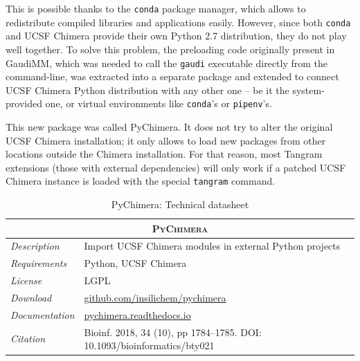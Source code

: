 This is possible thanks to the \texttt{conda} package manager,\cite{conda} which allows to redistribute compiled libraries and applications easily. However, since both \texttt{conda} and UCSF Chimera provide their own Python 2.7 distribution, they do not play well together. To solve this problem, the preloading code originally present in GaudiMM, which was needed to call the \texttt{gaudi} executable directly from the command-line, was extracted into a separate package and extended to connect UCSF Chimera Python distribution with any other one – be it the system-provided one, or virtual environments like \texttt{conda}'s or \texttt{pipenv}'s.

This new package was called PyChimera.\cite{pychimera} It does not try to alter the original UCSF Chimera installation; it only allows to load new packages from other locations outside the Chimera installation. For that reason, most Tangram extensions (those with external dependencies) will only work if a patched UCSF Chimera instance is loaded with the special \texttt{tangram} command.

\begin{table}[hbtp]
	\caption{PyChimera: Technical datasheet}
	\footnotesize
	\newcommand{\tableheading}[1]{\multicolumn{2}{c}{\textsc{#1}}}
	\begin{tabularx}{\textwidth}{RL}
		\toprule
		\tableheading{PyChimera}\\
		\toprule
		\textit{Description} & Import UCSF Chimera modules in external Python projects \\
		\midrule
		\textit{Requirements} & Python, UCSF Chimera \\
		\midrule
		\textit{License} & LGPL \\
		\midrule
		\textit{Download} & \href{https://github.com/insilichem/pychimera}{github.com/insilichem/pychimera} \\
		\midrule
		\textit{Documentation} & \href{http://pychimera.readthedocs.io}{pychimera.readthedocs.io} \\
		\midrule
		\textit{Citation} & Bioinf. 2018, 34 (10), pp 1784–1785. DOI: 10.1093/bioinformatics/bty021\cite{pychimera} \\
		\bottomrule

	\end{tabularx}
\end{table}

